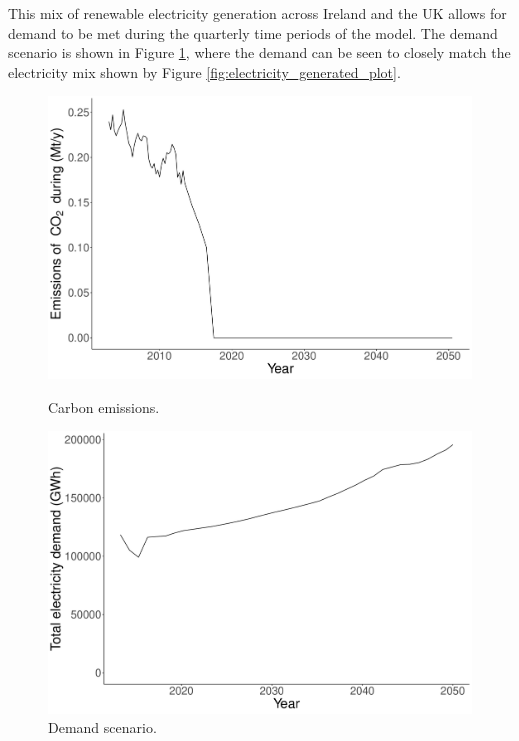 \documentclass{article}
\begin{document}
This mix of renewable electricity generation across Ireland and the UK allows for demand to be met during the quarterly time periods of the model. The demand scenario is shown in Figure \ref{fig:demand_scenario}, where the demand can be seen to closely match the electricity mix shown by Figure \ref{fig:electricity_generated_plot}.






\begin{figure}
\centering
\begin{minipage}{.4\textwidth}
  \centering
  \includegraphics[width=\linewidth]{figures/emissions_plot.pdf}
  \caption{Carbon emissions.}
  \label{fig:emissions_plot}
\end{minipage}%
\begin{minipage}{.4\textwidth}
  \centering
  \includegraphics[width=\linewidth]{figures/demand_plot.pdf}
  \caption{Demand scenario.}
  \label{fig:demand_scenario}
\end{minipage}
\end{figure}
\end{document}
